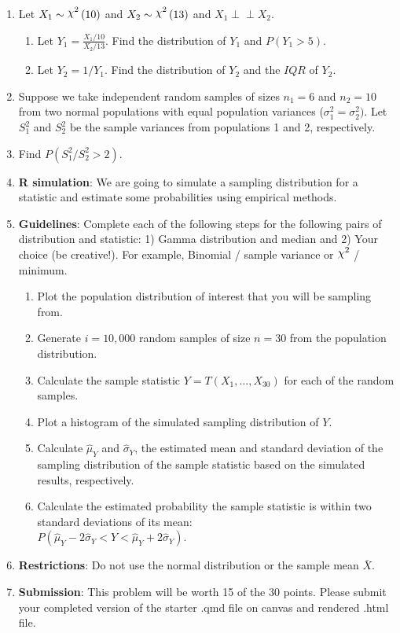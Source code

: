 \documentclass{article}
\newcommand{\vecn}[2]{#1_1, \ldots, #1_{#2}}	%
\newcommand{\follow}[1]{\sim \text{#1}\,}		%
\newcommand{\chisq}{\raisebox{2pt}{$\chi^2$}}		%
\newcommand{\ind}{\perp \!\!\! \perp}			%
\begin{document}
\begin{enumerate}
    \item Let $X_1 \follow{\chisq}(10)$ and $X_2 \follow{\chisq}(13)$ and $X_1 \ind X_2$.%
    \begin{enumerate}
        \item Let $\displaystyle Y_1 = \frac{X_1 / 10}{X_2 / 13}$. Find the distribution of $Y_1$ and $P(Y_1 > 5)$.
        \item Let $Y_2 = 1/Y_1$. Find the distribution of $Y_2$ and the $IQR$ of $Y_2$.
    \end{enumerate}\bigskip
        
    \item Suppose we take independent random samples of sizes $n_1 = 6$ and $n_2 = 10$ from two normal populations with equal population variances ($\sigma_1^2 = \sigma_2^2)$. Let $S_1^2$ and $S_2^2$ be the sample variances from populations 1 and 2, respectively.%
    \item[] Find $P(S_1^2 / S_2^2 > 2)$.
    
    \newpage
    
    \item \textbf{R simulation}: We are going to simulate a sampling distribution for a statistic and estimate some probabilities using empirical methods.
    \item[] \textbf{Guidelines}: Complete each of the following steps for the following pairs of distribution and statistic: 1) Gamma distribution and median and 2) Your choice (be creative!). For example, Binomial / sample variance or $\chisq$ / minimum.
    \begin{enumerate}
        \item Plot the population distribution of interest that you will be sampling from.
        \item Generate $i = 10,000$ random samples of size $n = 30$ from the population distribution.
        \item Calculate the sample statistic $Y = T(\vecn{X}{30})$ for each of the random samples.
        \item Plot a histogram of the simulated sampling distribution of $Y$.
        \item Calculate $\hat{\mu}_Y$ and $\hat{\sigma}_Y$, the estimated mean and standard deviation of the sampling distribution of the sample statistic based on the simulated results, respectively.
        \item Calculate the estimated probability the sample statistic is within two standard deviations of its mean: \\$P(\hat{\mu}_Y - 2\hat{\sigma}_Y < Y < \hat{\mu}_Y + 2\hat{\sigma}_Y)$.
    \end{enumerate}
    \item[] \textbf{Restrictions}: Do not use the normal distribution or the sample mean $\bar{X}$.
    \item[] \textbf{Submission}: This problem will be worth 15 of the 30 points. Please submit your completed version of the starter .qmd file on canvas and rendered .html file.
\end{enumerate}\vspace{100pt}
\end{document}
